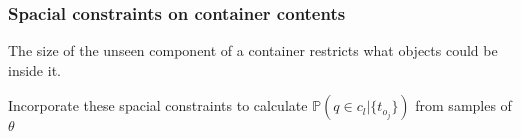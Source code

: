 \begin{frame}
\frametitle{Spacial constraints on container contents}
\begin{center}
The size of the unseen component of a container restricts what objects could be
inside it.
\vspace{3em}

Incorporate these spacial constraints to calculate 
$\mathbb{P}(q \in c_l|\{t_{o_j}\})$
from samples of $\theta$
\end{center}
\end{frame}

